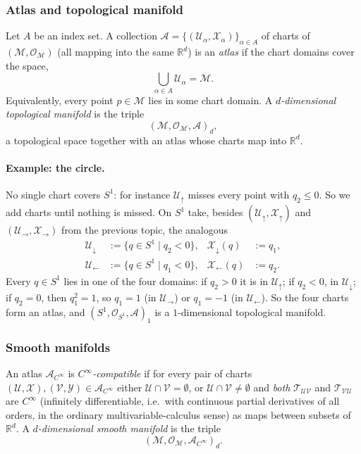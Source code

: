 \documentclass[11pt]{article}
\begin{document}
\subsubsection*{Atlas and topological manifold}
Let $A$ be an index set. A collection $\mathcal A=\{(\mathcal U_\alpha,\mathcal X_\alpha)\}_{\alpha\in A}$ of charts of $(\mathcal M,\mathcal O_{\mathcal M})$ (all mapping into the same $\mathbb R^d$) is an \emph{atlas} if the chart domains cover the space,
\[
\bigcup_{\alpha\in A}\mathcal U_\alpha=\mathcal M.
\]
Equivalently, every point $p\in\mathcal M$ lies in some chart domain. A \emph{$d$-dimensional topological manifold} is the triple
\[
(\mathcal M,\mathcal O_{\mathcal M},\mathcal A)_d,
\]
a topological space together with an atlas whose charts map into $\mathbb R^d$.

\paragraph{Example: the circle.} No single chart covers $S^1$: for instance $\mathcal U_\uparrow$ misses every point with $q_2\le0$. So we add charts until nothing is missed. On $S^1$ take, besides $(\mathcal U_\uparrow,\mathcal X_\uparrow)$ and $(\mathcal U_\to,\mathcal X_\to)$ from the previous topic, the analogous
\begin{align*}
\mathcal U_\downarrow&:=\{q\in S^1\mid q_2<0\},&\mathcal X_\downarrow(q)&:=q_1,\\
\mathcal U_\leftarrow&:=\{q\in S^1\mid q_1<0\},&\mathcal X_\leftarrow(q)&:=q_2.
\end{align*}
Every $q\in S^1$ lies in one of the four domains: if $q_2>0$ it is in $\mathcal U_\uparrow$; if $q_2<0$, in $\mathcal U_\downarrow$; if $q_2=0$, then $q_1^2=1$, so $q_1=1$ (in $\mathcal U_\to$) or $q_1=-1$ (in $\mathcal U_\leftarrow$). So the four charts form an atlas, and $(S^1,\mathcal O_{S^1},\mathcal A)_1$ is a $1$-dimensional topological manifold.

\subsubsection*{Smooth manifolds}
An atlas $\mathcal A_{C^\infty}$ is \emph{$C^\infty$-compatible} if for every pair of charts $(\mathcal U,\mathcal X),(\mathcal V,\mathcal Y)\in\mathcal A_{C^\infty}$ either $\mathcal U\cap\mathcal V=\emptyset$, or $\mathcal U\cap\mathcal V\neq\emptyset$ and \emph{both} $\mathcal T_{\mathcal{UV}}$ and $\mathcal T_{\mathcal{VU}}$ are $C^\infty$ (infinitely differentiable, i.e.\ with continuous partial derivatives of all orders, in the ordinary multivariable-calculus sense) as maps between subsets of $\mathbb R^d$. A \emph{$d$-dimensional smooth manifold} is the triple
\[
(\mathcal M,\mathcal O_{\mathcal M},\mathcal A_{C^\infty})_d.
\]
\end{document}
